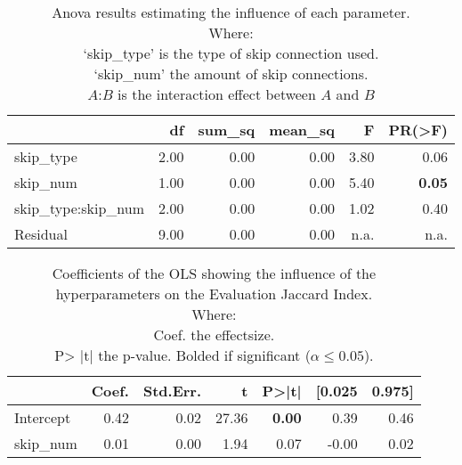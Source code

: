 \begin{table}[ht]
\centering
\caption{Anova results estimating the influence of each parameter.\\Where: \\\hphantom{tabb}`skip\_type' is the type of skip connection used.\\\hphantom{tabb}`skip\_num' the amount of skip connections.\\\hphantom{tabb}$A$:$B$ is the interaction effect between $A$ and $B$}
\label{tab:skip_importance_anova_all}
\begin{tabular}{lrrrrr}
\toprule
 & df & sum\_sq & mean\_sq & F & PR(>F) \\
\midrule
skip\_type & 2.00 & 0.00 & 0.00 & 3.80 & 0.06 \\
skip\_num & 1.00 & 0.00 & 0.00 & 5.40 & \textbf{0.05} \\
skip\_type:skip\_num & 2.00 & 0.00 & 0.00 & 1.02 & 0.40 \\
Residual & 9.00 & 0.00 & 0.00 & n.a. & n.a. \\
\bottomrule
\end{tabular}
\end{table}


\begin{table}[ht]
\centering
\caption{Coefficients of the OLS showing the influence of the hyperparameters on the Evaluation Jaccard Index.\\Where:\\\hphantom{tabb}Coef. the effectsize.\\\hphantom{tabb}P> |t| the p-value. Bolded if significant ($\alpha\le0.05$).}
\label{tab:skip_importance_ols_effects}
\begin{tabular}{lrrrrrr}
\toprule
 & Coef. & Std.Err. & t & P>|t| & [0.025 & 0.975] \\
\midrule
Intercept & 0.42 & 0.02 & 27.36 & \textbf{0.00} & 0.39 & 0.46 \\
skip\_num & 0.01 & 0.00 & 1.94 & 0.07 & -0.00 & 0.02 \\
\bottomrule
\end{tabular}
\end{table}
